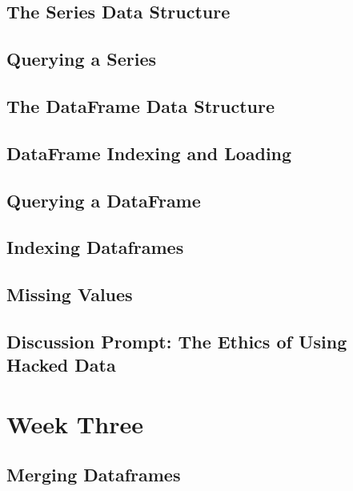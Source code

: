 \documentclass[11pt]{article}
\begin{document}
    \subsection{The Series Data Structure}
    \subsection{Querying a Series}
    \subsection{The DataFrame Data Structure}
    \subsection{DataFrame Indexing and Loading}
    \subsection{Querying a DataFrame}
    \subsection{Indexing Dataframes}
    \subsection{Missing Values}
    \subsection{Discussion Prompt: The Ethics of Using Hacked Data}

































\newpage
\section{Week Three}

    \subsection{Merging Dataframes}
\end{document}
